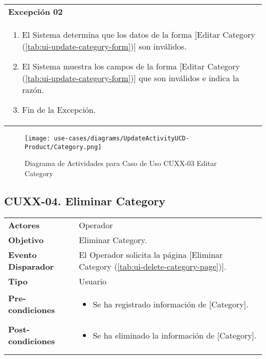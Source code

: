 	\begin{tabular}{ p{15.5cm} }
		\textbf{Excepci\'on 02} \\
		\begin{enumerate}
			\item El Sistema determina que los datos de la forma [Editar Category (\ref{tab:ui-update-category-form})] son inv\'alidos.
			\item El Sistema muestra los campos de la forma [Editar Category (\ref{tab:ui-update-category-form})] que son inv\'alidos e indica la raz\'on.
			\item Fin de la Excepci\'on.
		\end{enumerate}
	\end{tabular}
	
	\begin{figure}[H]
		\begin{center}
		 \label{tab:activity-update-ucd-entity-category}
		 \texttt{[image: use-cases/diagrams/UpdateActivityUCD-Product/Category.png]}
		 \caption{Diagrama de Actividades para Caso de Uso CUXX-03 Editar Category}
		\end{center}
	\end{figure}
	
	\clearpage
	\subsection{CUXX-04. Eliminar Category} \label{sec:cu-delete-Category}
	
	\begin{tabular}{ p{3.5cm} p{11.5cm} }
		\textbf{Actores} & Operador\\
		\textbf{Objetivo} & Eliminar Category.\\
		\textbf{Evento Disparador} & El Operador solicita la p\'agina [Eliminar Category (\ref{tab:ui-delete-category-page})].\\
		\textbf{Tipo} & Usuario\\
		\textbf{Pre-condiciones} &
			\begin{minipage}[t]{0.6\textwidth}
			\begin{itemize}[noitemsep,nolistsep]
			\setlength{\itemindent}{-.5cm}
				\item Se ha registrado informaci\'on de [Category].
			\end{itemize}
			\end{minipage} \\
		\textbf{Post-condiciones} &
			\begin{minipage}[t]{0.6\textwidth}
			\begin{itemize}[noitemsep,nolistsep]
			\setlength{\itemindent}{-.5cm}
				\item Se ha eliminado la informaci\'on de [Category].
			\end{itemize}
			\end{minipage} \\
		\\
	\end{tabular}
	
